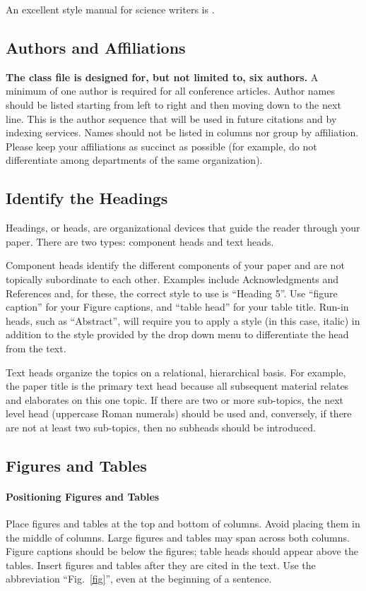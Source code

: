 \documentclass[conference]{IEEEtran}
\begin{document}
An excellent style manual for science writers is   .

\subsection{Authors and Affiliations}
\textbf{The class file is designed for, but not limited to, six authors.} A 
minimum of one author is required for all conference articles. Author names 
should be listed starting from left to right and then moving down to the 
next line. This is the author sequence that will be used in future citations 
and by indexing services. Names should not be listed in columns nor group by 
affiliation. Please keep your affiliations as succinct as possible (for 
example, do not differentiate among departments of the same organization).

\subsection{Identify the Headings}
Headings, or heads, are organizational devices that guide the reader through 
your paper. There are two types: component heads and text heads.

Component heads identify the different components of your paper and are not 
topically subordinate to each other. Examples include Acknowledgments and 
References and, for these, the correct style to use is ``Heading 5''. Use 
``figure caption'' for your Figure captions, and ``table head'' for your 
table title. Run-in heads, such as ``Abstract'', will require you to apply a 
style (in this case, italic) in addition to the style provided by the drop 
down menu to differentiate the head from the text.

Text heads organize the topics on a relational, hierarchical basis. For 
example, the paper title is the primary text head because all subsequent 
material relates and elaborates on this one topic. If there are two or more 
sub-topics, the next level head (uppercase Roman numerals) should be used 
and, conversely, if there are not at least two sub-topics, then no subheads 
should be introduced.

\subsection{Figures and Tables}
\paragraph{Positioning Figures and Tables} Place figures and tables at the top and 
bottom of columns. Avoid placing them in the middle of columns. Large 
figures and tables may span across both columns. Figure captions should be 
below the figures; table heads should appear above the tables. Insert 
figures and tables after they are cited in the text. Use the abbreviation 
``Fig.~\ref{fig}'', even at the beginning of a sentence.
\end{document}
